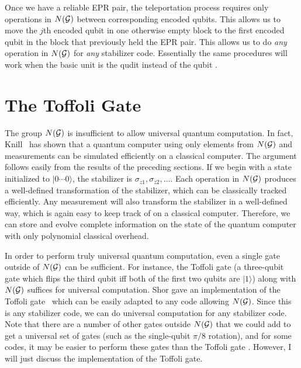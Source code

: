 \documentclass{report}
\newcommand{\G}{{\cal G}}
\newcommand{\ket}[1]{|{#1}\rangle}
\newcommand{\Zs}[1]{\sigma_{z{#1}}}
\begin{document}
Once we have a reliable EPR pair, the teleportation process requires only 
operations in $N(\G)$ between corresponding encoded qubits.  This allows us to 
move the $j$th encoded qubit in one otherwise empty block to the first encoded 
qubit in the block that previously held the EPR pair.  This allows us to do 
{\em any} operation in $N(\G)$ for {\em any} stabilizer code.  Essentially
the same procedures will work when the basic unit is the qudit instead of
the qubit \cite{gottesman-qudit}.

\section{The Toffoli Gate}
\label{sec-toffoli}

The group $N(\G)$ is insufficient to allow universal quantum computation.  
In fact, Knill~\cite{knill-normalizer} has shown that a quantum computer 
using only elements from $N(\G)$ and measurements can be simulated 
efficiently on a classical computer.  The argument follows easily from the 
results of the preceding sections.  If we begin with a state initialized to 
$\ket{0\cdots0}$, the stabilizer is $\Zs{1}, \Zs{2}, \ldots$.  Each operation 
in $N(\G)$ produces a well-defined transformation of the stabilizer, which 
can be classically tracked efficiently.  Any measurement will also 
transform the stabilizer in a well-defined way, which is again easy to keep 
track of on a classical computer.  Therefore, we can store and evolve 
complete information on the state of the quantum computer with only 
polynomial classical overhead.

In order to perform truly universal quantum computation, even a single 
gate outside of $N(\G)$ can be sufficient.  For instance, the Toffoli gate (a 
three-qubit gate which flips the third qubit iff both of the first two qubits 
are $\ket{1}$) along with $N(\G)$ suffices for universal computation.  Shor 
gave an implementation of the Toffoli gate~\cite{shor-fault-tol} which can 
be easily adapted to any code allowing $N(\G)$.  Since this is any stabilizer 
code, we can do universal computation for any stabilizer code.  Note that
there are a number of other gates outside $N(\G)$ that we could add to get
a universal set of gates (such as the single-qubit $\pi/8$ rotation), and
for some codes, it may be easier to perform these gates than the Toffoli
gate \cite{knill-concatenate2}.  However, I will just discuss the
implementation of the Toffoli gate.
\end{document}
